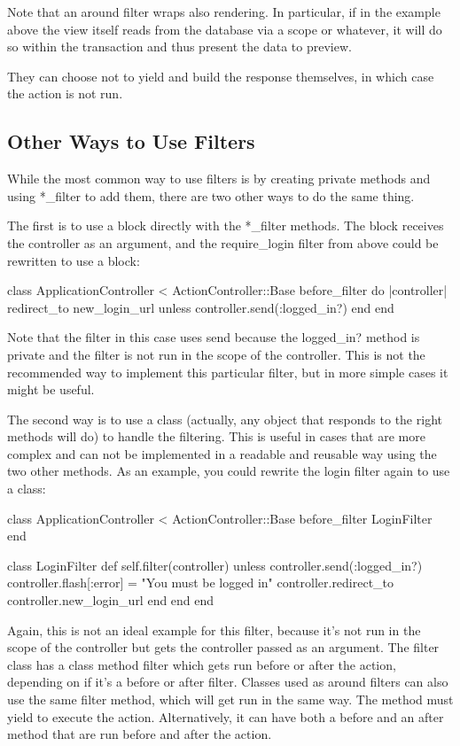 \documentclass[10pt]{book}
\newenvironment{code}{%
  \scriptsize
    \verbatim
}{%
    \endverbatim
    \newline
}
\begin{document}
Note that an around filter wraps also rendering. In particular, if in  the example above the view itself reads from the database via a scope  or whatever, it will do so within the transaction and thus present the  data to preview.

They can choose not to yield and build the response themselves, in which case the action is not run.

\subsection{ Other Ways to Use Filters}

While the most common way to use filters is by creating private  methods and using *\_filter to add them, there are two other ways to do  the same thing.

The first is to use a block directly with the *\_filter methods. The block receives the controller as an argument, and the require\_login filter from above could be rewritten to use a block:
\begin{code}
class ApplicationController < ActionController::Base
  before_filter do |controller|
    redirect_to new_login_url unless controller.send(:logged_in?)
  end
end
\end{code}

Note that the filter in this case uses send because the logged\_in?  method is private and the filter is not run in the scope of the  controller. This is not the recommended way to implement this particular  filter, but in more simple cases it might be useful.

The second way is to use a class (actually, any object that responds  to the right methods will do) to handle the filtering. This is useful in  cases that are more complex and can not be implemented in a readable  and reusable way using the two other methods. As an example, you could  rewrite the login filter again to use a class:
\begin{code}
class ApplicationController < ActionController::Base
  before_filter LoginFilter
end
 
class LoginFilter
  def self.filter(controller)
    unless controller.send(:logged_in?)
      controller.flash[:error] = "You must be logged in"
      controller.redirect_to controller.new_login_url
    end
  end
end
\end{code}

Again, this is not an ideal example for this filter, because it’s not  run in the scope of the controller but gets the controller passed as an  argument. The filter class has a class method filter which  gets run before or after the action, depending on if it’s a before or  after filter. Classes used as around filters can also use the same filter method, which will get run in the same way. The method must yield to execute the action. Alternatively, it can have both a before and an after method that are run before and after the action.
\end{document}
